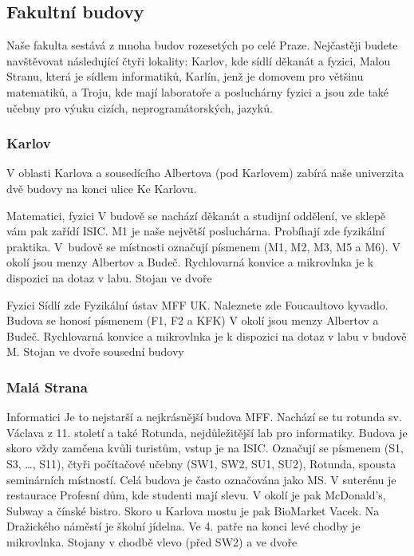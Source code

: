 \subsection{Fakultní budovy}
Naše fakulta sestává z mnoha budov rozesetých po celé Praze. Nejčastěji budete
navštěvovat následující čtyři lokality: Karlov, kde sídlí děkanát a fyzici,
Malou Stranu, která je sídlem informatiků, Karlín, jenž je domovem pro většinu
matematiků, a Troju, kde mají laboratoře a posluchárny fyzici a jsou zde také
učebny pro výuku cizích, neprogramátorských, jazyků.


\subsubsection{Karlov}
V oblasti Karlova a sousedícího Albertova (pod Karlovem) zabírá naše univerzita
dvě budovy na konci ulice Ke Karlovu.

{Matematici, fyzici}
{V budově se nachází děkanát a studijní oddělení, ve sklepě vám pak zařídí ISIC. M1 je naše největší posluchárna. Probíhají zde fyzikální praktika.}
{V~budově se místnosti označují písmenem  (M1, M2, M3, M5 a M6).}
{V okolí jsou menzy Albertov a Budeč. Rychlovarná konvice a mikrovlnka je k dispozici na dotaz v labu.}
{Stojan ve dvoře}

{Fyzici}
{Sídlí zde Fyzikální ústav MFF UK. Naleznete zde Foucaultovo kyvadlo.}
{Budova se honosí písmenem  (F1, F2 a KFK)}
{V okolí jsou menzy Albertov a Budeč. Rychlovarná konvice a mikrovlnka je k dispozici na dotaz v labu v budově M.}
{Stojan ve dvoře sousední budovy}

\subsubsection{Malá Strana}

{Informatici}
{Je to nejstarší a nejkrásnější budova MFF. Nachází se tu rotunda sv. Václava z 11. století a také Rotunda, nejdůležitější lab pro informatiky. Budova je skoro vždy zamčena kvůli turistům, vstup je na ISIC.}
{Označují se písmenem  (S1, S3, \dots, S11), čtyři počítačové učebny (SW1,
SW2, SU1, SU2), Rotunda, spousta seminárních místností. Celá budova je často
označována jako MS.}
{V suterénu je restaurace Profesní dům, kde studenti mají slevu. V okolí je pak McDonald's, Subway a čínské bistro. Skoro u Karlova mostu je pak BioMarket Vacek. Na Dražického náměstí je školní jídelna. Ve 4. patře na konci levé chodby je mikrovlnka.}
{Stojany v chodbě vlevo (před SW2) a ve dvoře}


